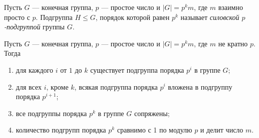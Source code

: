 
Пусть $ G $ --- конечная группа, $ p $ --- простое число и $ |G| = p^km $, где $ m $ взаимно просто с $ p $.
Подгруппа $ H \leqslant G $, порядок которой равен $ p^k $ называет \textit{силовской $ p $-подгруппой} группы $ G $.

\begin{theorem}[Силов]
	Пусть $ G $ --- конечная группа, $ p $ --- простое число и $ |G| = p^km $, где $ m $ не кратно $ p $.
	Тогда
	\begin{enumerate}
		\item для каждого $ i $ от $ 1 $ до $ k $ существует подгруппа порядка $ p^i $ в группе $ G $;
		
		\item для всех $ i $, кроме $ k $, всякая подгруппа порядка $ p^{i} $ 
		вложена в подгруппу порядка $ p^{i + 1} $;
		
		\item все подгруппы порядка $ p^k $ в группе $ G $ сопряжены;
		
		\item количество подгрупп порядка $ p^k $ сравнимо с 1 по модулю $ p $ и делит число $ m $.
	\end{enumerate}
\end{theorem}

